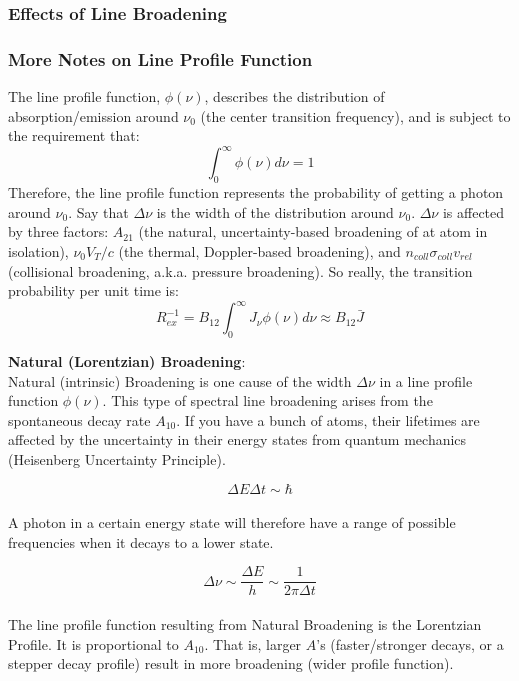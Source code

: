 \documentclass{article}
\def\ato{{A_{21}}}
\def\bot{{B_{12}}}
\def\ato{{A_{21}}}
\def\bot{{B_{12}}}
\def\ato{{A_{21}}}
\def\bot{{B_{12}}}
\begin{document}
\subsubsection{Effects of Line Broadening} 

\subsubsection{More Notes on Line Profile Function}

The line profile function, $\phi(\nu)$, describes the
distribution of absorption/emission around $\nu_0$ (the
center transition frequency), and is subject to the requirement that:
$$\int_0^\infty{\phi(\nu)d\nu}=1$$
Therefore, the line profile function represents the probability of getting a photon around $\nu_0$. 
Say that $\Delta\nu$ is the width
of the distribution around $\nu_0$.  $\Delta \nu $ is affected by three factors:
$\ato$ (the natural, uncertainty-based broadening of at atom in isolation),
$\nu_0 V_T/ c$ (the thermal, Doppler-based broadening), and 
$n_{coll}\sigma_{coll}v_{rel}$
(collisional broadening, a.k.a. pressure broadening).
So really, the transition probability per unit time is:
$$R_{ex}^{-1}=\bot\int_0^\infty{J_\nu\phi(\nu)d\nu}\approx\bot\bar J$$

\textbf{Natural (Lorentzian) Broadening}:\\

Natural (intrinsic) Broadening is one cause of the width $\Delta\nu$ in a line profile function $\phi(\nu)$. This type of spectral line broadening arises from the spontaneous decay rate $A_{10}$. If you have a bunch of atoms, their lifetimes are affected by the uncertainty in their energy states from quantum mechanics (Heisenberg Uncertainty Principle). 

$$\Delta E\Delta t \sim \hbar$$\\

A photon in a certain energy state will therefore have a range of possible frequencies when it decays to a lower state.

$$\Delta \nu \sim {\frac{\Delta E}{h}} \sim {\frac{1}{2\pi \Delta t}}$$\\

The line profile function resulting from Natural Broadening is the Lorentzian Profile. It is proportional to $A_{10}$. That is, larger $A$'s (faster/stronger decays, or a stepper decay profile) result in more broadening (wider profile function).\\
\end{document}
